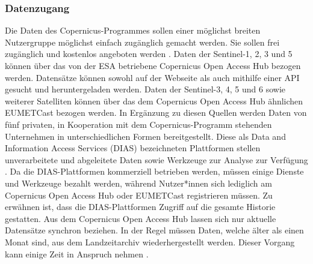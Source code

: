 \subsubsection{Datenzugang}
Die Daten des Copernicus-Programmes sollen einer möglichst breiten Nutzergruppe möglichst einfach zugänglich gemacht werden. Sie sollen frei zugänglich und kostenlos angeboten 
werden \cite{copernicus_regulation}. Daten der Sentinel-1, 2, 3 und 5 können über das von der ESA betriebene Copernicus Open Access Hub bezogen werden. Datensätze können sowohl
auf der Webseite als auch mithilfe einer API gesucht und heruntergeladen werden. Daten der Sentinel-3, 4, 5 und 6 sowie weiterer Satelliten können über das 
dem Copernicus Open Access Hub ähnlichen EUMETCast bezogen werden.
In Ergänzung zu diesen Quellen werden Daten von fünf privaten, in Kooperation mit dem Copernicus-Programm stehenden Unternehmen in unterschiedlichen Formen bereitgestellt. 
Diese als Data and Information Access Services (DIAS) bezeichneten Plattformen stellen unverarbeitete und abgeleitete Daten sowie Werkzeuge zur Analyse zur Verfügung \cite{dias_factsheet}.
Da die DIAS-Plattformen kommerziell betrieben werden, müssen einige Dienste und Werkzeuge bezahlt werden, während Nutzer*innen sich lediglich am Copernicus Open Access Hub oder EUMETCast 
registrieren müssen. Zu erwähnen ist, dass die DIAS-Plattformen Zugriff auf die gesamte Historie gestatten. 
Aus dem Copernicus Open Access Hub lassen sich nur aktuelle Datensätze synchron beziehen. 
In der Regel müssen Daten, welche älter als einen Monat sind, aus dem Landzeitarchiv wiederhergestellt werden. Dieser Vorgang kann einige Zeit in Anspruch nehmen \cite{open_access_hub_overview}. 

